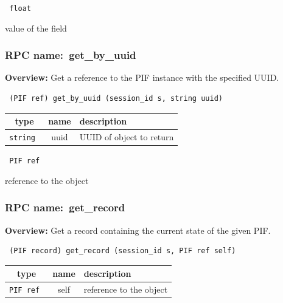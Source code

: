 \vspace{0.3cm}

{\tt 
float
}


value of the field
\vspace{0.3cm}
\vspace{0.3cm}
\vspace{0.3cm}
\subsubsection{RPC name:~get\_by\_uuid}

{\bf Overview:} 
Get a reference to the PIF instance with the specified UUID.

\begin{verbatim} (PIF ref) get_by_uuid (session_id s, string uuid)\end{verbatim}



 
\vspace{0.3cm}
\begin{tabular}{|c|c|p{7cm}|}
 \hline
{\bf type} & {\bf name} & {\bf description} \\ \hline
{\tt string } & uuid & UUID of object to return \\ \hline 

\end{tabular}

\vspace{0.3cm}

{\tt 
PIF ref
}


reference to the object
\vspace{0.3cm}
\vspace{0.3cm}
\vspace{0.3cm}
\subsubsection{RPC name:~get\_record}

{\bf Overview:} 
Get a record containing the current state of the given PIF.

\begin{verbatim} (PIF record) get_record (session_id s, PIF ref self)\end{verbatim}



 
\vspace{0.3cm}
\begin{tabular}{|c|c|p{7cm}|}
 \hline
{\bf type} & {\bf name} & {\bf description} \\ \hline
{\tt PIF ref } & self & reference to the object \\ \hline 

\end{tabular}

